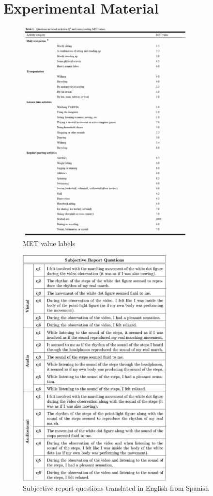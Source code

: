 \appendix

\chapter{Experimental Material}
\begin{figure}[ht]
    \centering
    \includegraphics[width=0.8\textwidth]{appendix/met_values.png}
    \caption{MET value labels \parencite{Bonn_2012}}
    \label{fig: met_values}
\end{figure}
\begin{figure}[ht]
    \centering
    \includegraphics[width=0.70\textwidth]{appendix/questions.png}
    \caption{Subjective report questions translated in English from Spanish}
    \label{table: Behavioral questions}
\end{figure}
